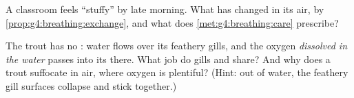 \begin{exercise}[$\star\star$]\label{exo:g4:breathing:10}
A classroom feels ``stuffy'' by late morning. What has
changed in its air, by \cref{prop:g4:breathing:exchange},
and what does \cref{met:g4:breathing:care} prescribe?
\end{exercise}

\begin{exercise}[$\star\star\star$]\label{exo:g4:breathing:11}
The trout has no : water flows over its feathery gills,
and the oxygen \emph{dissolved in the water} passes into its
 there. What job do gills and  share? And why does
a trout suffocate in air, where oxygen is plentiful?
(Hint: out of water, the feathery gill surfaces collapse and
stick together.)
\end{exercise}
